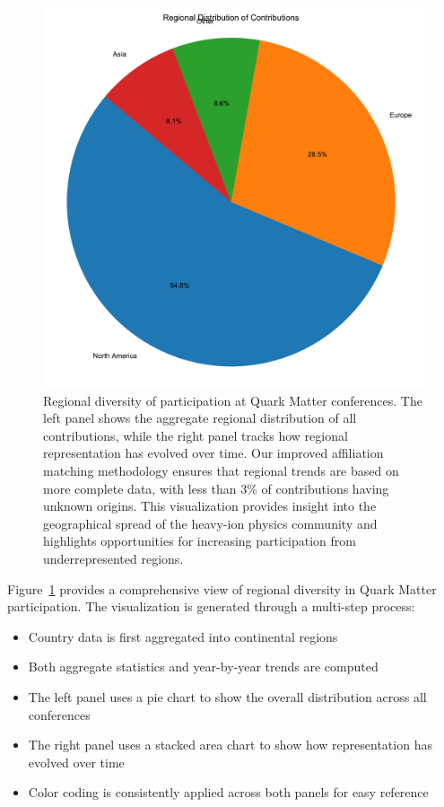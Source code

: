 \documentclass[a4paper,11pt]{article}
\begin{document}
\begin{figure}[H]
\centering
\includegraphics[width=\textwidth]{figures/regional_diversity.pdf}
\caption{Regional diversity of participation at Quark Matter conferences. The left panel shows the aggregate regional distribution of all contributions, while the right panel tracks how regional representation has evolved over time. Our improved affiliation matching methodology ensures that regional trends are based on more complete data, with less than 3\% of contributions having unknown origins. This visualization provides insight into the geographical spread of the heavy-ion physics community and highlights opportunities for increasing participation from underrepresented regions.}
\label{fig:regional_diversity}
\end{figure}

Figure~\ref{fig:regional_diversity} provides a comprehensive view of regional diversity in Quark Matter participation. The visualization is generated through a multi-step process:

\begin{itemize}
    \item Country data is first aggregated into continental regions
    \item Both aggregate statistics and year-by-year trends are computed
    \item The left panel uses a pie chart to show the overall distribution across all conferences
    \item The right panel uses a stacked area chart to show how representation has evolved over time
    \item Color coding is consistently applied across both panels for easy reference
\end{itemize}
\end{document}
